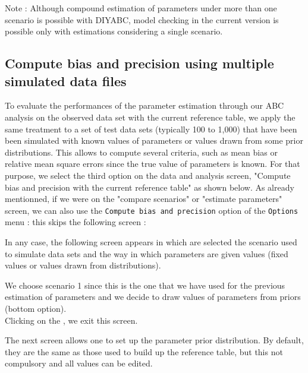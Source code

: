 {Note : Although compound estimation of parameters under more than one scenario is possible with DIYABC, model checking in the current version is possible only with estimations considering a single scenario.
\newpage
\subsection{Compute bias and precision using multiple simulated data files}
To evaluate the performances of the parameter estimation through our ABC analysis on the observed data set with the current reference table, we apply the same treatment to  a set of test data sets (typically 100 to 1,000) that have been been simulated with known values of parameters or values drawn from some prior distributions. This allows to compute several criteria, such as mean bias or relative mean square errors since the true value of parameters is known. For that purpose, we select the third option on the data and analysis screen, "Compute bias and precision with the current reference table" as shown below. As already mentionned, if we were on the "compare scenarios" or "estimate parameters" screen, we can also use the \texttt{Compute bias and precision} option of the \texttt{Options} menu : this skips the following screen :


In any case, the following screen appears in which are selected the scenario used to simulate data sets  and the way in which parameters are given values (fixed values or values drawn from distributions).


We choose scenario 1 since this is the one that we have used for the previous estimation of parameters and we decide to draw values of parameters from priors (bottom option). \\
Clicking on the , we exit this screen.

\newpage
The next screen allows one to set up the parameter prior distribution. By default, they are the same as those used to build up the reference table, but this not compulsory and all values can be edited.

}
